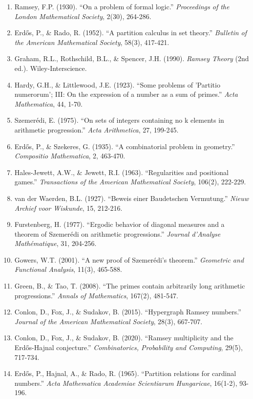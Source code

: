 \documentclass[12pt]{article}
\begin{document}
\begin{enumerate}
    \item Ramsey, F.P. (1930). ``On a problem of formal logic.'' \textit{Proceedings of the London Mathematical Society}, 2(30), 264-286.
    \item Erdős, P., \& Rado, R. (1952). ``A partition calculus in set theory.'' \textit{Bulletin of the American Mathematical Society}, 58(3), 417-421.
    \item Graham, R.L., Rothschild, B.L., \& Spencer, J.H. (1990). \textit{Ramsey Theory} (2nd ed.). Wiley-Interscience.
    \item Hardy, G.H., \& Littlewood, J.E. (1923). ``Some problems of 'Partitio numerorum'; III: On the expression of a number as a sum of primes.'' \textit{Acta Mathematica}, 44, 1-70.
    \item Szemerédi, E. (1975). ``On sets of integers containing no k elements in arithmetic progression.'' \textit{Acta Arithmetica}, 27, 199-245.
    \item Erdős, P., \& Szekeres, G. (1935). ``A combinatorial problem in geometry.'' \textit{Compositio Mathematica}, 2, 463-470.
    \item Hales-Jewett, A.W., \& Jewett, R.I. (1963). ``Regularities and positional games.'' \textit{Transactions of the American Mathematical Society}, 106(2), 222-229.
    \item van der Waerden, B.L. (1927). ``Beweis einer Baudetschen Vermutung.'' \textit{Nieuw Archief voor Wiskunde}, 15, 212-216.
    \item Furstenberg, H. (1977). ``Ergodic behavior of diagonal measures and a theorem of Szemerédi on arithmetic progressions.'' \textit{Journal d'Analyse Mathématique}, 31, 204-256.
    \item Gowers, W.T. (2001). ``A new proof of Szemerédi's theorem.'' \textit{Geometric and Functional Analysis}, 11(3), 465-588.
    \item Green, B., \& Tao, T. (2008). ``The primes contain arbitrarily long arithmetic progressions.'' \textit{Annals of Mathematics}, 167(2), 481-547.
    \item Conlon, D., Fox, J., \& Sudakov, B. (2015). ``Hypergraph Ramsey numbers.'' \textit{Journal of the American Mathematical Society}, 28(3), 667-707.
    \item Conlon, D., Fox, J., \& Sudakov, B. (2020). ``Ramsey multiplicity and the Erdős-Hajnal conjecture.'' \textit{Combinatorics, Probability and Computing}, 29(5), 717-734.
    \item Erdős, P., Hajnal, A., \& Rado, R. (1965). ``Partition relations for cardinal numbers.'' \textit{Acta Mathematica Academiae Scientiarum Hungaricae}, 16(1-2), 93-196.

\end{enumerate}
\end{document}
